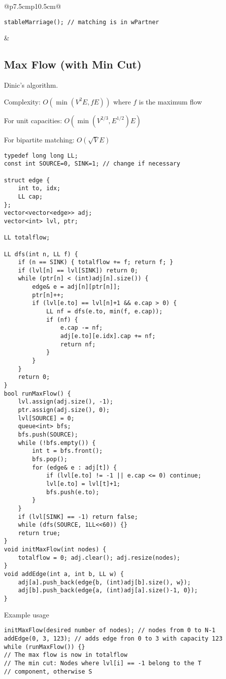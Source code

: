 \documentclass[letterpaper]{article}
\begin{document}
\begin{tabular}{@{}p{7.5cm}p{10.5cm}@{}}
\begin{lstlisting}
stableMarriage(); // matching is in wPartner
\end{lstlisting}

&
\subsection{Max Flow (with Min Cut)}

Dinic's algorithm.

Complexity: $O\left(\min\left(V^2E, fE\right)\right)$ where $f$ is the maximum flow

For unit capacities: $O\left(\min\left(V^{2/3}, E^{1/2}\right)E\right)$

For bipartite matching: $O\left(\sqrt VE\right)$

\begin{lstlisting}
typedef long long LL;
const int SOURCE=0, SINK=1; // change if necessary

struct edge {
	int to, idx;
	LL cap;
};
vector<vector<edge>> adj;
vector<int> lvl, ptr;

LL totalflow;

LL dfs(int n, LL f) {
	if (n == SINK) { totalflow += f; return f; }
	if (lvl[n] == lvl[SINK]) return 0;
	while (ptr[n] < (int)adj[n].size()) {
		edge& e = adj[n][ptr[n]];
		ptr[n]++;
		if (lvl[e.to] == lvl[n]+1 && e.cap > 0) {
			LL nf = dfs(e.to, min(f, e.cap));
			if (nf) {
				e.cap -= nf;
				adj[e.to][e.idx].cap += nf;
				return nf;
			}
		}
	}
	return 0;
}
bool runMaxFlow() {
	lvl.assign(adj.size(), -1);
	ptr.assign(adj.size(), 0);
	lvl[SOURCE] = 0;
	queue<int> bfs;
	bfs.push(SOURCE);
	while (!bfs.empty()) {
		int t = bfs.front();
		bfs.pop();
		for (edge& e : adj[t]) {
			if (lvl[e.to] != -1 || e.cap <= 0) continue;
			lvl[e.to] = lvl[t]+1;
			bfs.push(e.to);
		}
	}
	if (lvl[SINK] == -1) return false;
	while (dfs(SOURCE, 1LL<<60)) {}
	return true;
}
void initMaxFlow(int nodes) {
	totalflow = 0; adj.clear(); adj.resize(nodes);
}
void addEdge(int a, int b, LL w) {
	adj[a].push_back(edge{b, (int)adj[b].size(), w});
	adj[b].push_back(edge{a, (int)adj[a].size()-1, 0});
}
\end{lstlisting}
Example usage
\begin{lstlisting}
initMaxFlow(desired number of nodes); // nodes from 0 to N-1
addEdge(0, 3, 123); // adds edge fron 0 to 3 with capacity 123
while (runMaxFlow()) {}
// The max flow is now in totalflow
// The min cut: Nodes where lvl[i] == -1 belong to the T
// component, otherwise S
\end{lstlisting}
\end{tabular}
\end{document}
